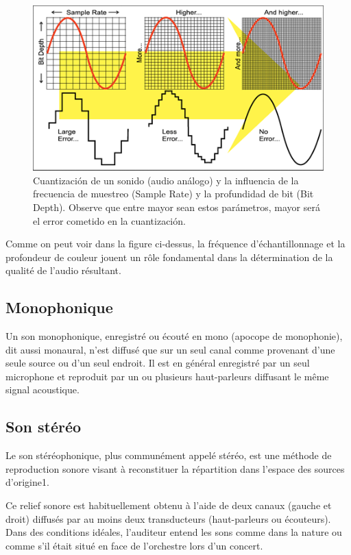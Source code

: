 \documentclass[conference,onecolumn]{IEEEtran}
\begin{document}
 \begin{figure}[H]
 \centering
    \includegraphics[scale=1]{img5.png}
    \caption{Cuantización de un sonido (audio análogo) y la influencia de la frecuencia de muestreo (Sample Rate) y la profundidad de bit (Bit Depth). Observe que entre mayor sean estos parámetros, mayor será el error cometido en la cuantización.}
\end{figure}

Comme on peut voir dans la figure ci-dessus, la fréquence d'échantillonnage et la profondeur de couleur jouent un rôle fondamental dans la détermination de la qualité de l'audio résultant.

\subsection{Monophonique}
 Un son monophonique, enregistré ou écouté en mono (apocope de monophonie), dit aussi monaural, n'est diffusé que sur un seul canal comme provenant d'une seule source ou d'un seul endroit. Il est en général enregistré par un seul microphone et reproduit par un ou plusieurs haut-parleurs diffusant le même signal acoustique.
 
\subsection{Son stéréo}
Le son stéréophonique, plus communément appelé stéréo, est une méthode de reproduction sonore visant à reconstituer la répartition dans l'espace des sources d'origine1.

Ce relief sonore est habituellement obtenu à l'aide de deux canaux (gauche et droit) diffusés par au moins deux transducteurs (haut-parleurs ou écouteurs). Dans des conditions idéales, l'auditeur entend les sons comme dans la nature ou comme s'il était situé en face de l'orchestre lors d'un concert.
\end{document}
